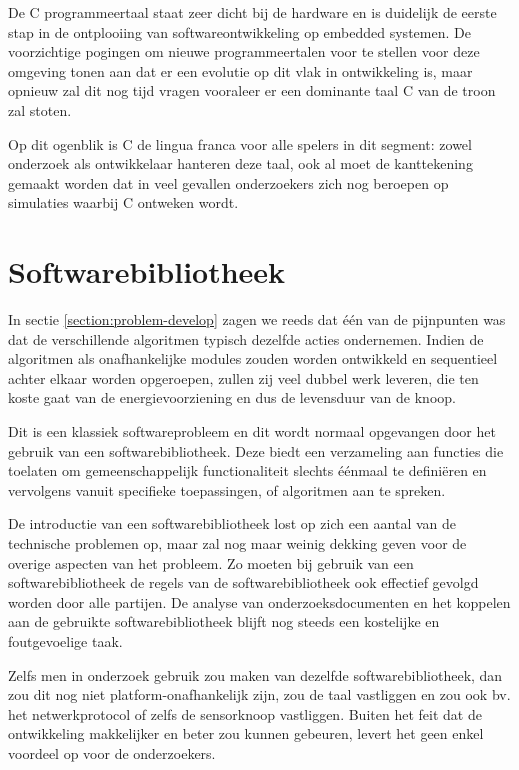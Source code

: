 De C programmeertaal staat zeer dicht bij de hardware en is duidelijk de eerste
stap in de ontplooiing van softwareontwikkeling op embedded systemen. De
voorzichtige pogingen om nieuwe programmeertalen voor te stellen voor deze
omgeving tonen aan dat er een evolutie op dit vlak in ontwikkeling is, maar
opnieuw zal dit nog tijd vragen vooraleer er een dominante taal C van de troon
zal stoten.

Op dit ogenblik is C de lingua franca voor alle spelers in dit segment: zowel
onderzoek als ontwikkelaar hanteren deze taal, ook al moet de kanttekening
gemaakt worden dat in veel gevallen onderzoekers zich nog beroepen op
simulaties waarbij C ontweken wordt.

\section{Softwarebibliotheek}
\label{section:solution-library}

In sectie \ref{section:problem-develop} zagen we reeds dat \'e\'en van de
pijnpunten was dat de verschillende algoritmen typisch dezelfde acties
ondernemen. Indien de algoritmen als onafhankelijke modules zouden worden
ontwikkeld en sequentieel achter elkaar worden opgeroepen, zullen zij veel
dubbel werk leveren, die ten koste gaat van de energievoorziening en dus de
levensduur van de knoop.

Dit is een klassiek softwareprobleem en dit wordt normaal opgevangen door het
gebruik van een softwarebibliotheek. Deze biedt een verzameling aan functies
die toelaten om gemeenschappelijk functionaliteit slechts \'e\'enmaal te
defini\"eren en vervolgens vanuit specifieke toepassingen, of algoritmen aan te
spreken.

De introductie van een softwarebibliotheek lost op zich een aantal van de
technische problemen op, maar zal nog maar weinig dekking geven voor de overige
aspecten van het probleem. Zo moeten bij gebruik van een softwarebibliotheek de
regels van de softwarebibliotheek ook effectief gevolgd worden door alle
partijen. De analyse van onderzoeksdocumenten en het koppelen aan de gebruikte
softwarebibliotheek blijft nog steeds een kostelijke en foutgevoelige taak.

Zelfs men in onderzoek gebruik zou maken van dezelfde softwarebibliotheek, dan
zou dit nog niet platform-onafhankelijk zijn, zou de taal vastliggen en zou ook
bv. het netwerkprotocol of zelfs de sensorknoop vastliggen. Buiten het feit dat
de ontwikkeling makkelijker en beter zou kunnen gebeuren, levert het geen enkel
voordeel op voor de onderzoekers.

